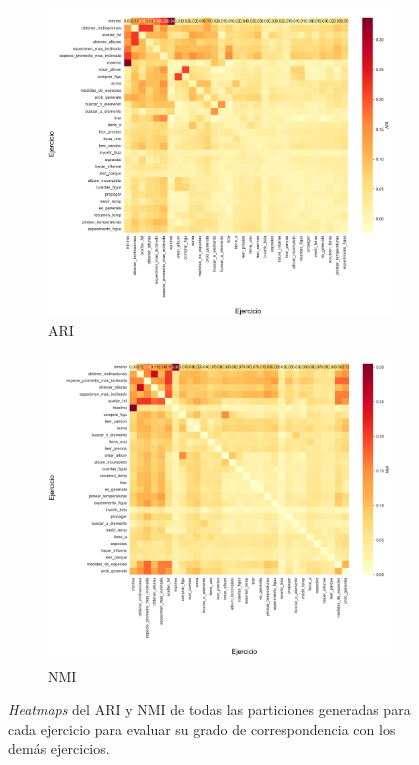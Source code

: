 \documentclass[11pt,a4paper,twoside,openany]{tesis}
\begin{document}
\begin{figure}[H]
    \centering
    \begin{subfigure}{0.45\textwidth}
        \includegraphics[width=\linewidth]{imagenes/ari.png}
        \caption{ARI}
        \label{fig:figura1}
    \end{subfigure}
    \hfill
    \begin{subfigure}{0.45\textwidth}
        \includegraphics[width=\linewidth]{imagenes/nmi.png}
        \caption{NMI}
        \label{fig:figura2}
    \end{subfigure}
    \caption{\emph{Heatmaps} del ARI y NMI de todas las particiones generadas para cada ejercicio para evaluar su grado de correspondencia con los demás ejercicios.}
    \label{ari_nmi}
\end{figure}
\end{document}
